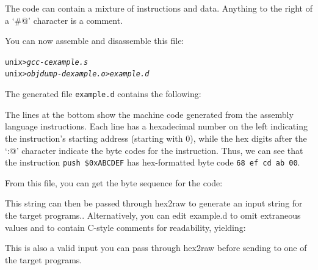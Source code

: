 \documentclass[11pt]{article}
\newenvironment{ccode}%
{\small}%
{}
\newenvironment{tty}%
{\small\begin{alltt}}%
{\end{alltt}}
\begin{document}
The code can contain a mixture of instructions and data.  Anything to
the right of a `\verb@#@' character is a comment.  

You can now assemble and disassemble this file:
\begin{tty}
    unix>{\em gcc -c example.s}
    unix>{\em objdump -d example.o > example.d}
\end{tty}
The generated file {\tt example.d} contains the following:
\begin{ccode}
\begin{tty}

\end{tty}
\end{ccode}
The lines at the bottom show the machine code generated from the
assembly language instructions.  Each line has a hexadecimal number
on the left
indicating the instruction's starting address (starting with 0), while the hex digits
after the `\verb@:@' character indicate the byte codes for the
instruction.  Thus, we can see that the instruction {\tt push
\$0xABCDEF} has hex-formatted byte code {\tt 68 ef cd ab 00}.

From this file, you can get the byte sequence for the code:
\begin{ccode}
\begin{tty}

\end{tty}
\end{ccode}
This string can then be passed through {\sc hex2raw} to generate an
input string for the target programs..  Alternatively, you can edit
example.d to omit extraneous values and to contain C-style comments for
readability, yielding:
\begin{ccode}
\begin{alltt}

\end{alltt}
\end{ccode}
This is also a valid input you can pass through {\sc hex2raw} before
sending to one of the target programs.


\end{document}
